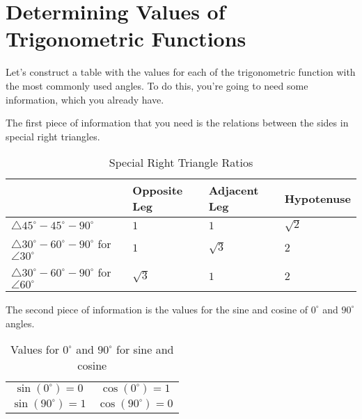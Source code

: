 
\section{Determining Values of Trigonometric Functions}
\label{sec:determining_values_of_trigonometric_functions}

Let's construct a table with the values for each of the trigonometric function
with the most commonly used angles. To do this, you're going to need some
information, which you already have.

The first piece of information that you need is the relations between the sides
in special right triangles.

\begin{table}[htpb]
	\centering

	\begin{tabular}{llll}
		\hline
		                                                                     & \textbf{Opposite Leg} & \textbf{Adjacent Leg} & \textbf{Hypotenuse} \\
		\hline
		$\triangle 45^{\circ}-45^{\circ}-90^{\circ}$                         & $1$                   & $1$                   & $\sqrt{2}$          \\
		$\triangle 30^{\circ}-60^{\circ}-90^{\circ}$ for $\angle 30^{\circ}$ & $1$                   & $\sqrt{3}$            & $2$                 \\
		$\triangle 30^{\circ}-60^{\circ}-90^{\circ}$ for $\angle 60^{\circ}$ & $\sqrt{3}$            & $1$                   & $2$                 \\
		\hline
	\end{tabular}

	\caption{Special Right Triangle Ratios}
	\label{tab:special_right_triangle_ratios}
\end{table}

The second piece of information is the values for the sine and cosine of
$0^{\circ}$ and $90^{\circ}$ angles.

\begin{table}[H]
	\centering

	\begin{tabular}{cc}
		$\displaystyle \sin(0^{\circ}) = 0$  & $\displaystyle \cos(0^{\circ}) = 1$  \\
		$\displaystyle \sin(90^{\circ}) = 1$ & $\displaystyle \cos(90^{\circ}) = 0$
	\end{tabular}

	\caption{Values for $0^{\circ}$ and $90^{\circ}$ for sine and cosine}
	\label{tab:values_for_0_deg_and_90_deg_for sine and cosine}
\end{table}

